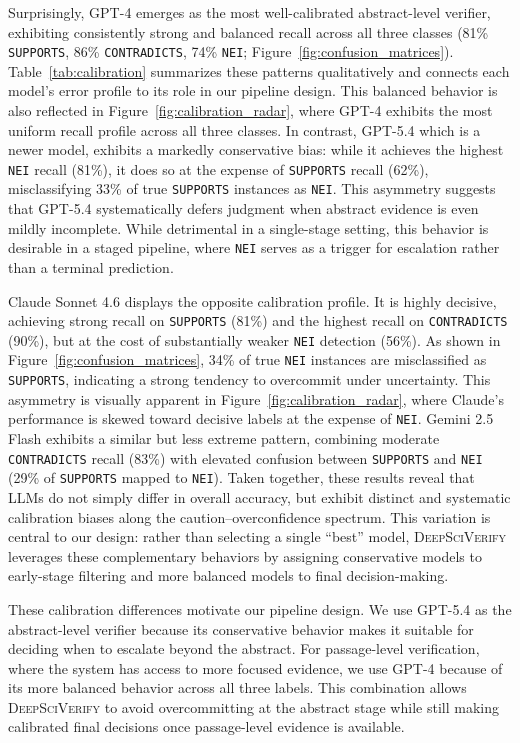 \documentclass{article}
\theoremstyle{plain}
\theoremstyle{definition}
\theoremstyle{remark}
\begin{document}
Surprisingly, GPT-4 emerges as the most well-calibrated abstract-level verifier, exhibiting consistently strong and balanced recall across all three classes (81\% \texttt{SUPPORTS}, 86\% \texttt{CONTRADICTS}, 74\% \texttt{NEI}; Figure~\ref{fig:confusion_matrices}). Table~\ref{tab:calibration} summarizes these patterns qualitatively and connects each model's error profile to its role in our pipeline design. This balanced behavior is also reflected in Figure~\ref{fig:calibration_radar}, where GPT-4 exhibits the most uniform recall profile across all three classes. In contrast, GPT-5.4 which is a newer model, exhibits a markedly conservative bias: while it achieves the highest \texttt{NEI} recall (81\%), it does so at the expense of \texttt{SUPPORTS} recall (62\%), misclassifying 33\% of true \texttt{SUPPORTS} instances as \texttt{NEI}. This asymmetry suggests that GPT-5.4 systematically defers judgment when abstract evidence is even mildly incomplete. While detrimental in a single-stage setting, this behavior is desirable in a staged pipeline, where \texttt{NEI} serves as a trigger for escalation rather than a terminal prediction.

Claude Sonnet 4.6 displays the opposite calibration profile. It is highly decisive, achieving strong recall on \texttt{SUPPORTS} (81\%) and the highest recall on \texttt{CONTRADICTS} (90\%), but at the cost of substantially weaker \texttt{NEI} detection (56\%). As shown in Figure~\ref{fig:confusion_matrices}, 34\% of true \texttt{NEI} instances are misclassified as \texttt{SUPPORTS}, indicating a strong tendency to overcommit under uncertainty. This asymmetry is visually apparent in Figure~\ref{fig:calibration_radar}, where Claude's performance is skewed toward decisive labels at the expense of \texttt{NEI}. Gemini 2.5 Flash exhibits a similar but less extreme pattern, combining moderate \texttt{CONTRADICTS} recall (83\%) with elevated confusion between \texttt{SUPPORTS} and \texttt{NEI} (29\% of \texttt{SUPPORTS} mapped to \texttt{NEI}). Taken together, these results reveal that LLMs do not simply differ in overall accuracy, but exhibit distinct and systematic calibration biases along the caution--overconfidence spectrum. This variation is central to our design: rather than selecting a single ``best'' model, \textsc{DeepSciVerify} leverages these complementary behaviors by assigning conservative models to early-stage filtering and more balanced models to final decision-making.

These calibration differences motivate our pipeline design. We use GPT-5.4 as the abstract-level verifier because its conservative behavior makes it suitable for deciding when to escalate beyond the abstract. For passage-level verification, where the system has access to more focused evidence, we use GPT-4 because of its more balanced behavior across all three labels. This combination allows \textsc{DeepSciVerify} to avoid overcommitting at the abstract stage while still making calibrated final decisions once passage-level evidence is available.
\end{document}
